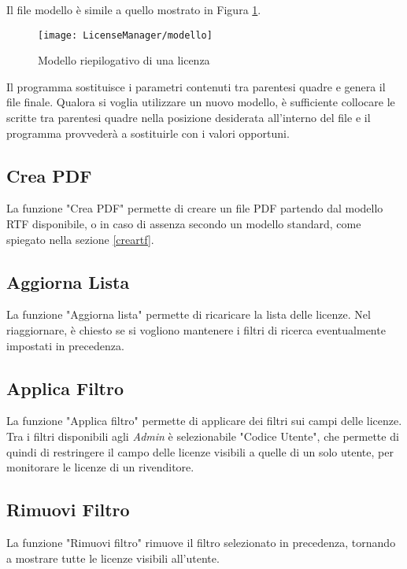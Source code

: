 Il file modello è simile a quello mostrato in Figura \ref{modello}.

\begin{figure}[!h] 
    \centering 
    \texttt{[image: LicenseManager/modello]} 
    \caption{Modello riepilogativo di una licenza}
\label{modello}

\end{figure}

Il programma sostituisce i parametri contenuti tra parentesi quadre e genera il file finale. Qualora si voglia utilizzare un nuovo modello, è sufficiente collocare le scritte tra parentesi quadre nella posizione desiderata all’interno del file e il programma provvederà a sostituirle con i valori opportuni.

\subsection{Crea PDF}

La funzione "Crea PDF" permette di creare un file PDF partendo dal modello RTF disponibile, o in caso di assenza secondo un modello standard, come spiegato nella sezione \ref{creartf}.

\subsection{Aggiorna Lista}
La funzione "Aggiorna lista" permette di ricaricare la lista delle licenze. Nel riaggiornare, è chiesto se si vogliono mantenere i filtri di ricerca eventualmente impostati in precedenza.

\subsection{Applica Filtro}
La funzione "Applica filtro" permette di applicare dei filtri sui campi delle licenze. Tra i filtri disponibili agli \textit{Admin} è selezionabile "Codice Utente", che permette di quindi di restringere il campo delle licenze visibili a quelle di un solo utente, per monitorare le licenze di un rivenditore.

\subsection{Rimuovi Filtro}
La funzione "Rimuovi filtro" rimuove il filtro selezionato in precedenza, tornando a mostrare tutte le licenze visibili all’utente.


